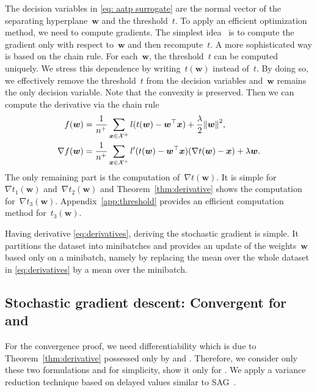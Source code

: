 The decision variables in \eqref{eq: aatp surrogate} are the normal vector of the separating hyperplane~$\bm{w}$ and the threshold~$t$. To apply an efficient optimization method, we need to compute gradients. The simplest idea~\cite{grill2016learning} is to compute the gradient only with respect to~$\bm{w}$ and then recompute~$t$. A more sophisticated way is based on the chain rule. For each~$\bm{w}$, the threshold~$t$ can be computed uniquely. We stress this dependence by writing~$t(\bm{w})$ instead of~$t$. By doing so, we effectively remove the threshold~$t$ from the decision variables and~$\bm{w}$ remains the only decision variable. Note that the convexity is preserved. Then we can compute the derivative via the chain rule
\begin{equation}\label{eq:derivatives}
  \begin{aligned}
  f(\bm{w}) & = \frac{1}{n^+}\sum_{\bm{x} \in \Xc^+} l(t(\bm{w}) - \bm{w}^\top \bm{x}) + \frac{\lambda}{2}\norm{\bm{w}}^2, \\
  \nabla f(\bm{w}) & = \frac{1}{n^+}\sum_{\bm{x} \in \Xc^+} l'(t(\bm{w}) - \bm{w}^\top \bm{x})(\nabla t(\bm{w}) - \bm{x}) + \lambda \bm{w}.
  \end{aligned}
\end{equation}
The only remaining part is the computation of~$\nabla t(\bm{w})$. It is simple for~$\nabla t_1(\bm{w})$ and~$\nabla t_2(\bm{w})$ and Theorem~\ref{thm:derivative} shows the computation for~$\nabla t_3(\bm{w})$. Appendix~\ref{app:threshold} provides an efficient computation method for~$t_3(\bm{w})$.

Having derivative \eqref{eq:derivatives}, deriving the stochastic gradient is simple. It partitions the dataset into minibatches and provides an update of the weights~$\bm{w}$ based only on a minibatch, namely by replacing the mean over the whole dataset in \eqref{eq:derivatives} by a mean over the minibatch.

\subsection{Stochastic gradient descent: Convergent for \PatMat and \PatMatNP}

For the convergence proof, we need differentiability which is due to Theorem~\ref{thm:derivative} possessed only by \PatMat and \PatMatNP. Therefore, we consider only these two formulations and for simplicity, show it only for \PatMat. We apply a variance reduction technique based on delayed values similar to SAG~\cite{schmidt2017minimizing}. 

